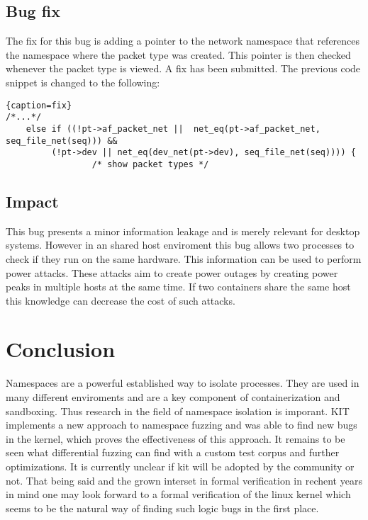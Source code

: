 \documentclass[10pt,twocolumn,a4paper]{article}
\begin{document}
\subsection{Bug fix}
The fix for this bug is adding a pointer to the network namespace that references the namespace
where the packet type was created. This pointer is then checked whenever the packet type is
viewed. A fix has been submitted.\cite{4}
The previous code snippet is changed to the following:
\begin{lstlisting}{caption=fix}
/*...*/
	else if ((!pt->af_packet_net ||  net_eq(pt->af_packet_net, seq_file_net(seq))) &&
		 (!pt->dev || net_eq(dev_net(pt->dev), seq_file_net(seq)))) {
                 /* show packet types */
\end{lstlisting}
\cite{4}
\subsection{Impact}
This bug presents a minor information leakage and is merely relevant for desktop systems.
However in an shared host enviroment this bug allows two processes to check if they run on the same
hardware. This information can be used to perform power attacks. These attacks aim to create power
outages by creating power peaks in multiple hosts at the same time. If two containers share the same
host this knowledge can decrease the cost of such attacks\cite{7}.
\section{Conclusion}
Namespaces are a powerful established way to isolate processes. They are used in many different enviroments 
and are a key component of containerization and sandboxing. Thus research in the field of namespace isolation is
imporant. KIT implements a new approach to namespace fuzzing and was able to find new bugs in the
kernel, which proves the effectiveness of this approach. It remains to be seen what differential
fuzzing can find with a custom  test corpus and further optimizations. It is currently unclear if
kit will be adopted by the community or not. That being said and the  grown interset in formal
verification in rechent years in mind one may look forward to a formal verification of the linux
kernel which seems to be the natural way of finding such logic bugs in the first place.


\end{document}
